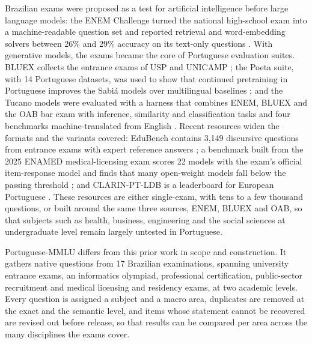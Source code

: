 Brazilian exams were proposed as a test for artificial intelligence before
large language models: the ENEM Challenge turned the national high-school
exam into a machine-readable question set and reported retrieval and
word-embedding solvers between 26\% and 29\% accuracy on its text-only
questions \citep{silveira2018enem}. With generative models, the exams became
the core of Portuguese evaluation suites. BLUEX collects the entrance exams of
USP and UNICAMP \citep{almeida2023bluex}; the Poeta suite, with 14 Portuguese
datasets, was used to show that continued pretraining in Portuguese improves
the Sabi\'a models over multilingual baselines \citep{pires2023sabia}; and the
Tucano models were evaluated with a harness that combines ENEM, BLUEX and the
OAB bar exam with inference, similarity and classification tasks and four
benchmarks machine-translated from English \citep{correa2025tucano}.
Recent resources widen the formats and the variants covered: EduBench
contains 3,149 discursive questions from entrance exams with expert reference
answers \citep{paiola2026edubench}; a benchmark built from the 2025 ENAMED
medical-licensing exam scores 22 models with the exam's official
item-response model and finds that many open-weight models fall below the
passing threshold \citep{correia2026enamed}; and CLARIN-PT-LDB is a
leaderboard for European Portuguese \citep{silva2026clarinptldb}. These
resources are either single-exam, with tens to a few thousand questions, or
built around the same three sources, ENEM, BLUEX and OAB, so that subjects
such as health, business, engineering and the social sciences at
undergraduate level remain largely untested in Portuguese.

Portuguese-MMLU differs from this prior work in scope and construction. It
gathers native questions from 17 Brazilian examinations, spanning university
entrance exams, an informatics olympiad, professional certification,
public-sector recruitment and medical licensing and residency exams, at two
academic levels. Every question is assigned a subject and a macro area,
duplicates are removed at the exact and the semantic level, and items whose
statement cannot be recovered are revised out before release, so that results
can be compared per area across the many disciplines the exams cover.
